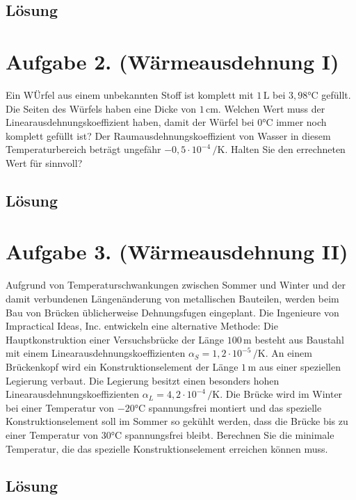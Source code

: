 \documentclass[german,12pt]{homework}
\newcommand{\sis}[1]{\,\si{#1}}
\newcommand{\degC}{\si{\degreeCelsius}}
\begin{document}
    \subsection*{Lösung}

    \section*{Aufgabe 2. (Wärmeausdehnung I)}

    \begin{problem}
        Ein WÜrfel aus einem unbekannten Stoff ist komplett mit
        \(1\sis{\liter}\) bei \(3,98\degC\) gefüllt. Die Seiten des Würfels
        haben eine Dicke von \(1\sis{\centi\meter}\). Welchen Wert muss der
        Linearausdehnungskoeffizient haben, damit der Würfel bei \(0\degC\)
        immer noch komplett gefüllt ist? Der Raumausdehnungskoeffizient von
        Wasser in diesem Temperaturbereich beträgt ungefähr \(-0,5 \cdot 10^{-4}
        \sis{\per\kelvin}\). Halten Sie den errechneten Wert für sinnvoll?
    \end{problem}

    \subsection*{Lösung}

    \section*{Aufgabe 3. (Wärmeausdehnung II)}

    \begin{problem}
        Aufgrund von Temperaturschwankungen zwischen Sommer und Winter und der
        damit verbundenen Längenänderung von metallischen Bauteilen, werden
        beim Bau von Brücken üblicherweise Dehnungsfugen eingeplant. Die
        Ingenieure von Impractical Ideas, Inc. entwickeln eine alternative
        Methode: Die Hauptkonstruktion einer Versuchsbrücke der Länge
        \(100\sis{\meter}\) besteht aus Baustahl mit einem
        Linearausdehnungskoeffizienten \(\alpha_S = 1,2 \cdot 10^{-5}
        \sis{\per\kelvin}\). An einem Brückenkopf wird ein Konstruktionselement
        der Länge \(1\sis{\meter}\) aus einer speziellen Legierung verbaut. Die
        Legierung besitzt einen besonders hohen Linearausdehnungskoeffizienten
        \(\alpha_L = 4,2 \cdot 10^{-4}\sis{\per\kelvin}\). Die Brücke wird im
        Winter bei einer Temperatur von \(-20\degC\) spannungsfrei montiert und
        das spezielle Konstruktionselement soll im Sommer so gekühlt werden,
        dass die Brücke bis zu einer Temperatur von \(30\degC\) spannungsfrei
        bleibt. Berechnen Sie die minimale Temperatur, die das spezielle
        Konstruktionselement erreichen können muss.
    \end{problem}

    \subsection*{Lösung}
\end{document}
